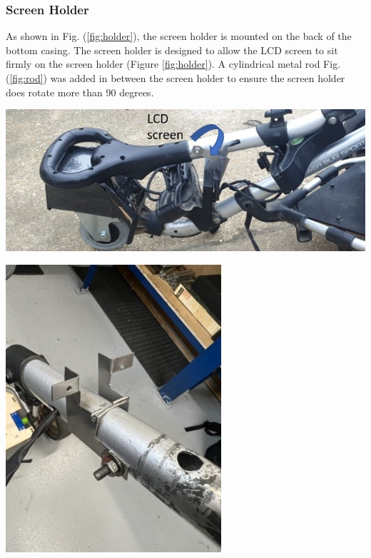 \documentclass[11pt,landscape]{article}
\newenvironment{Figure}
  {\par\medskip\noindent\minipage{\linewidth}}
  {\endminipage\par\medskip}
\begin{document}
\begin{multicols}{3}
    \subsubsection{Screen Holder}
    As shown in Fig. (\ref{fig:holder}), the screen holder is mounted on the
    back of the bottom casing. The screen holder is designed to allow the LCD
    screen to sit firmly on the screen holder (Figure \ref{fig:holder}). A
    cylindrical metal rod Fig. (\ref{fig:rod}) was added in between the
    screen holder to ensure the screen holder does rotate more than 90 degrees.
    
    \begin{Figure}
        \begin{center}
            \includegraphics[width=\textwidth]{Figure39.jpg}
            \label{fig:holder}
        \end{center}
    \end{Figure}
    
    \begin{Figure}
        \begin{center}
            \includegraphics[width=0.6\textwidth]{Figure31.jpg}
            \label{fig:rod}
        \end{center}
    \end{Figure}
    

\end{multicols}
\end{document}
